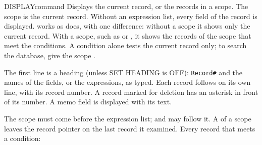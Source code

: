 \begin{XbaseEntry}{DISPLAY}{command}
Displays the current record, or the records in a scope.
\Syntax
{}
\Defaults
The scope is the current record.  Without an expression list, every field of
the record is displayed.
\Usage
{} works as  does, with one difference: without a scope it
shows only the current record.  With a scope, such as  or 
, it shows the records of the scope that meet the conditions.  A
 condition alone tests the current record only; to search the
database, give the scope .

The first line is a heading (unless SET HEADING is OFF): \texttt{Record\#}
and the names of the fields, or the expressions, as typed.  Each record follows
on its own line, with its record number.  A record marked for deletion has an
asterisk in front of its number.  A memo field is displayed with its text.

The scope must come before the expression list;  and  may
follow it.  A  of a scope leaves the record pointer on the last
record it examined.
\Examples
{}
Every record that meets a condition:
\end{XbaseEntry}

